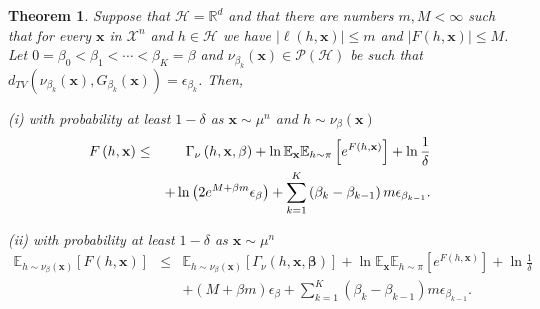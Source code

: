 \documentclass{article} %
\newtheorem{theorem}{Theorem}[section]
\begin{document}
\begin{theorem}
	Suppose that $\mathcal{H}=\mathbb{R}^{d}$ and that there are numbers $%
	m,M<\infty $ such that for every $\mathbf{x}$ in $\mathcal{X}^{n}$ and $h\in 
	\mathcal{H}$ we have $\left\vert \ell \left( h,\mathbf{x}\right) \right\vert
	\leq m$ and $\left\vert F\left( h,\mathbf{x}\right) \right\vert \leq M$. Let 
	$0=\beta _{0}<\beta _{1}<\cdots<\beta _{K}=\beta $ and $\nu _{\beta _{k}}\left( 
	\mathbf{x}\right) \in \mathcal{P}\left( \mathcal{H}\right) $ be such that $%
	d_{TV}\left( \nu _{\beta _{k}}\left( \mathbf{x}\right) ,G_{\beta_k }\left( 
	\mathbf{x}\right) \right) =\epsilon _{\beta _{k}}$. Then,
	
	(i) with probability at least $1-\delta $ as $\mathbf{x}\sim \mu ^{n}$ and $%
	h\sim \nu _{\beta }\left( \mathbf{x}\right) $%
	\begin{eqnarray*}
		F\left( h,\mathbf{x}\right) &\leq &\Gamma _{\nu }\left( h,\mathbf{x},\mathbf{%
			\beta }\right) +\ln \mathbb{E}_{\mathbf{x}}\mathbb{E}_{h\sim \pi }\left[
		e^{F\left( h,\mathbf{x}\right) }\right] +\ln \frac{1}{\delta } \\
		&&+\ln \left( 2e^{M+\beta m}\epsilon _{\beta }\right) +\sum_{k=1}^{K}\left(
		\beta _{k}-\beta _{k-1}\right) m\epsilon _{\beta _{k-1}}.
	\end{eqnarray*}
	
	(ii) with probability at least $1-\delta $ as $\mathbf{x}\sim \mu ^{n}$ 
	\begin{eqnarray*}
		\mathbb{E}_{h\sim \nu _{\beta }\left( \mathbf{x}\right) }\left[ F\left( h,%
		\mathbf{x}\right) \right]  &\leq &\mathbb{E}_{h\sim \nu _{\beta }\left( 
			\mathbf{x}\right) }\left[ \Gamma _{\nu }\left( h,\mathbf{x},\bm{\beta}%
		\right) \right] +\ln \mathbb{E}_{\mathbf{x}}\mathbb{E}_{h\sim \pi }\left[
		e^{F\left( h,\mathbf{x}\right) }\right] +\ln \frac{1}{\delta } \\
		&&+\left( M+\beta m\right) \epsilon _{\beta }+\sum_{k=1}^{K}\left( \beta
		_{k}-\beta _{k-1}\right) m\epsilon _{\beta _{k-1}}.
	\end{eqnarray*}%
	
    \end{theorem}
\end{document}
